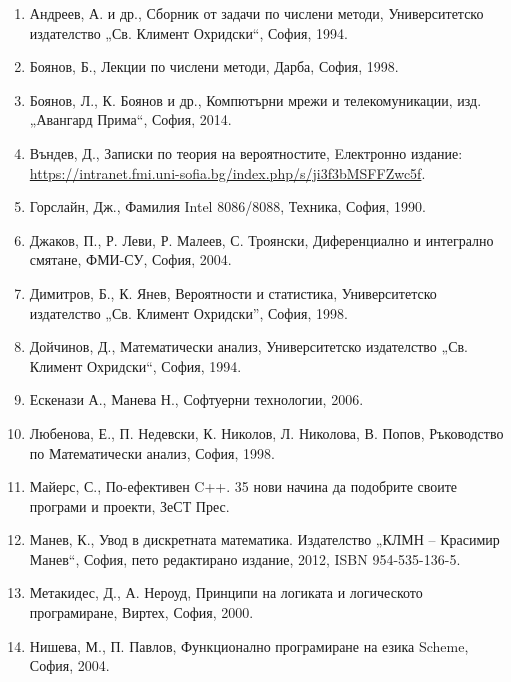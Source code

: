 
\begingroup
\renewcommand{\labelenumi}{[\arabic{enumi}]}
\setlength{\parskip}{0pt}
\begin{enumerate}\setlength{\itemsep}{0.25em}
\item Андреев, А. и др., Сборник от задачи по числени методи, Университетско издателство „Св. Климент Охридски“, София, 1994.
\item Боянов, Б., Лекции по числени методи, Дарба, София, 1998.
\item Боянов, Л., К. Боянов и др., Компютърни мрежи и телекомуникации, изд. „Авангард Прима“, София, 2014.
\item Въндев, Д., Записки по теория на вероятностите, Eлектронно издание: \url{https://intranet.fmi.uni-sofia.bg/index.php/s/ji3f3bMSFFZwc5f}.
\item Горслайн, Дж., Фамилия Intel 8086/8088, Техника, София, 1990.
\item Джаков, П., Р. Леви, Р. Малеев, С. Троянски, Диференциално и интегрално смятане, ФМИ-СУ, София, 2004.
\item Димитров, Б., К. Янев, Вероятности и статистика, Университетско издателство „Св. Климент Охридски”, София, 1998.
\item Дойчинов, Д., Математически анализ, Университетско издателство „Св. Климент Охридски“, София, 1994.
\item Ескенази А., Манева Н., Софтуерни технологии, 2006.
\item Любенова, Е., П. Недевски, К. Николов, Л. Николова, В. Попов, Ръководство по Математически анализ, София, 1998.
\item Майерс, С., По-ефективен C++. 35 нови начина да подобрите своите програми и проекти, ЗеСТ Прес.
\item Манев, К., Увод в дискретната математика. Издателство „КЛМН – Красимир Манев“, София, пето редактирано издание, 2012, ISBN 954-535-136-5.
\item Метакидес, Д., А. Нероуд, Принципи на логиката и логическото програмиране, Виртех, София, 2000.
\item Нишева, М., П. Павлов, Функционално програмиране на езика Scheme, София, 2004.

\end{enumerate}
